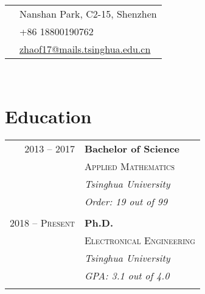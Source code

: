 \documentclass[10pt]{article} %
\begin{document}
{\begin{minipage}[t]{0.44\textwidth}
\colorbox{shade}{\textcolor{text1}{
\begin{tabular}{c|p{7cm}}
\raisebox{-4pt}{\textifsymbol{18}} & Nanshan Park, C2-15, Shenzhen \\ %
\raisebox{-3pt}{\Mobilefone} & +86 18800190762 \\ %
\raisebox{-1pt}{\Letter} & \href{mailto:zhaof17@mails.tsinghua.edu.cn}{zhaof17@mails.tsinghua.edu.cn} \\ %
\end{tabular}
}
}\\[10pt]


\section{Education}

\begin{tabular}{rl} %


2013 -- 2017 & \textbf{Bachelor of Science} \\
& \textsc{Applied Mathematics} \\
& \textit{Tsinghua University}\\
& \textit{Order: 19 out of 99}\\
&\\

2018 -- \textsc{Present} & \textbf{Ph.D.} \\
& \textsc{Electronical Engineering} \\
& \textit{Tsinghua University}\\
& \textit{GPA: 3.1 out of 4.0}\\
&\\


\end{tabular}\\[10pt]



\end{minipage}}
\end{document}
